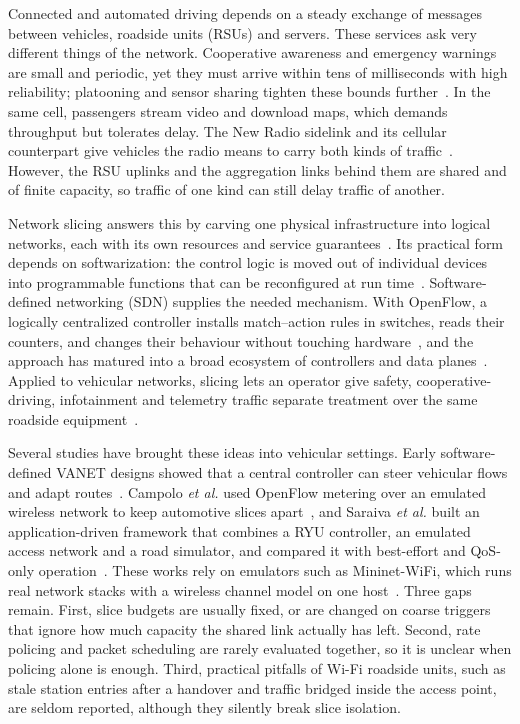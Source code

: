 \documentclass[conference]{IEEEtran}
\begin{document}
Connected and automated driving depends on a steady exchange of messages between vehicles, roadside units (RSUs) and servers. These services ask very different things of the network. Cooperative awareness and emergency warnings are small and periodic, yet they must arrive within tens of milliseconds with high reliability; platooning and sensor sharing tighten these bounds further~\cite{3gpp22186}. In the same cell, passengers stream video and download maps, which demands throughput but tolerates delay. The New Radio sidelink and its cellular counterpart give vehicles the radio means to carry both kinds of traffic~\cite{garcia2021tutorial}. However, the RSU uplinks and the aggregation links behind them are shared and of finite capacity, so traffic of one kind can still delay traffic of another.

Network slicing answers this by carving one physical infrastructure into logical networks, each with its own resources and service guarantees~\cite{foukas2017slicing}. Its practical form depends on softwarization: the control logic is moved out of individual devices into programmable functions that can be reconfigured at run time~\cite{afolabi2018slicing}. Software-defined networking (SDN) supplies the needed mechanism. With OpenFlow, a logically centralized controller installs match--action rules in switches, reads their counters, and changes their behaviour without touching hardware~\cite{mckeown2008openflow}, and the approach has matured into a broad ecosystem of controllers and data planes~\cite{kreutz2015sdn}. Applied to vehicular networks, slicing lets an operator give safety, cooperative-driving, infotainment and telemetry traffic separate treatment over the same roadside equipment~\cite{campolo2017v2x}.

Several studies have brought these ideas into vehicular settings. Early software-defined VANET designs showed that a central controller can steer vehicular flows and adapt routes~\cite{ku2014sdvanet}. Campolo \emph{et al.} used OpenFlow metering over an emulated wireless network to keep automotive slices apart~\cite{campolo2018road}, and Saraiva \emph{et al.} built an application-driven framework that combines a RYU controller, an emulated access network and a road simulator, and compared it with best-effort and QoS-only operation~\cite{saraiva2021its}. These works rely on emulators such as Mininet-WiFi, which runs real network stacks with a wireless channel model on one host~\cite{fontes2015mininetwifi}. Three gaps remain. First, slice budgets are usually fixed, or are changed on coarse triggers that ignore how much capacity the shared link actually has left. Second, rate policing and packet scheduling are rarely evaluated together, so it is unclear when policing alone is enough. Third, practical pitfalls of Wi-Fi roadside units, such as stale station entries after a handover and traffic bridged inside the access point, are seldom reported, although they silently break slice isolation.
\end{document}
